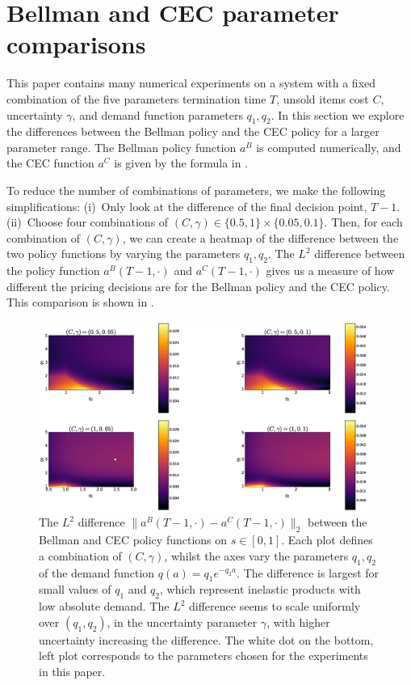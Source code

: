 \documentclass[main.tex]{subfiles}
\begin{document}
\listoftodos

\section{Bellman and CEC parameter comparisons}\label{sec:parameter_comparison}
This paper contains many numerical experiments on a system
with a fixed combination of the five parameters
termination time $T$, unsold items cost $C$, uncertainty $\gamma$, and
demand function parameters $q_1,q_2$.
In this section we explore the differences between the Bellman policy
and the CEC policy for a larger parameter range.
The Bellman policy function $a^B$ is computed numerically, and
the CEC function $a^C$ is given by the formula in
.

To reduce the number of combinations of parameters, we make the
following simplifications:
(i)~Only look at the difference of the final decision point, $T-1$.
(ii)~Choose four combinations of
$(C,\gamma)\in\{0.5,1\}\times\{0.05,0.1\}$.
Then,
for each combination of $(C,\gamma)$,
we can create a heatmap of the difference between the two policy
functions by varying the parameters $q_1,q_2$.
The $L^2$ difference between the
policy function $a^B(T-1,\cdot)$ and $a^C(T-1,\cdot)$
gives us a measure of how different the pricing decisions are for
the Bellman policy and the CEC policy.
This comparison is shown in .
\begin{figure}[htbp]
    \includegraphics[width=0.96\textwidth]{./img/policy_diff_heatmaps}
  \caption{The $L^2$ difference $\|a^B(T-1,\cdot)-a^C(T-1,\cdot)\|_2$
    between the Bellman and CEC policy functions on $s\in[0,1]$.
    Each plot defines a combination of $(C,\gamma)$, whilst
    the axes vary the parameters $q_1,q_2$ of the demand function
    $q(a)=q_1e^{-q_2a}$.
    The difference is largest for small values of $q_1$ and $q_2$,
    which represent inelastic products with low absolute demand.
    The $L^2$ difference seems to scale uniformly over $(q_1,q_2)$, in the uncertainty
    parameter $\gamma$, with higher uncertainty increasing the
    difference.
    The white dot on the bottom, left plot corresponds to the
    parameters chosen for the experiments in this paper.
  }\label{fig:policy_diff_heatmaps}
\end{figure}
\end{document}
